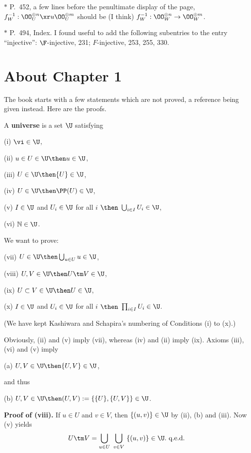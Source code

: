 \documentclass[12pt]{article}
\theoremstyle{remark}
\theoremstyle{definition}
\begin{document}
\nn$*$ P.~452, a few lines before the penultimate display of the page, $f_W^{-1}:\OO_U^{\oplus n}\xr u\OO_U^{\oplus m}$ should be (I think) $f_W^{-1}:\OO_W^{\oplus n}\to\OO_W^{\oplus m}$.

\nn$*$ P.~494, Index. I found useful to add the following subentries to the entry ``injective'': $\F$-injective, 231; $F$-injective, 253, 255, 330.


\section{About Chapter 1}


The book starts with a few statements which are not proved, a reference being given instead. Here are the proofs.

A \textbf{universe} is a set $\U$ satisfying 

(i) $\vi\in\U$,

(ii) $u\in U\in\U\then u\in\U$,

(iii) $U\in\U\then\{U\}\in\U$,

(iv) $U\in\U\then\PP(U)\in\U$,

(v) $I\in\U$ and $U_i\in\U$ for all $i$ $\then$ $\bigcup_{i\in I}U_i\in\U$,

(vi) $\mathbb N\in\U$.

\nn We want to prove:

(vii) $U\in\U\then\bigcup_{u\in U}u\in\U$,

(viii) $U,V\in\U\then U\tm V\in\U$,

(ix) $U\subset V\in\U\then U\in\U$,

(x) $I\in\U$ and $U_i\in\U$ for all $i$ $\then$ $\prod_{i\in I}U_i\in\U$.

\nn(We have kept Kashiwara and Schapira's numbering of Conditions (i) to (x).) 

\nn Obviously, (ii) and (v) imply (vii), whereas (iv) and (ii) imply (ix). Axioms (iii), (vi) and (v) imply

(a) $U,V\in\U\then\{U,V\}\in\U$,

\nn and thus

(b) $U,V\in\U\then(U,V):=\{\{U\},\{U,V\}\}\in\U$.

\nn\textbf{Proof of (viii).} If $u\in U$ and $v\in V$, then $\{(u,v)\}\in\U$ by (ii), (b) and (iii). Now (v) yields 
$$
U\tm V=\bigcup_{u\in U}\ \bigcup_{v\in V}\ \{(u,v)\}\in\U.\text{ q.e.d.} 
$$ 
\end{document}

